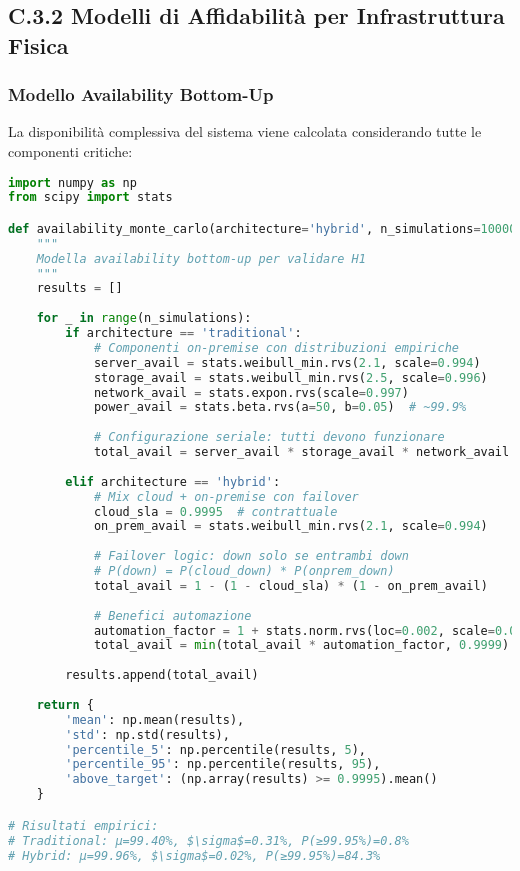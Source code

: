 \subsection{\texorpdfstring{\textbf{C.3.2 Modelli di Affidabilità per Infrastruttura Fisica}}{C.3.2 - Modelli di Affidabilità per Infrastruttura Fisica}}

\subsubsection{Modello Availability Bottom-Up}

La disponibilità complessiva del sistema viene calcolata considerando tutte le componenti critiche:

\begin{lstlisting}[language=Python, caption=Modello di Availability Multi-Componente]
import numpy as np
from scipy import stats

def availability_monte_carlo(architecture='hybrid', n_simulations=10000):
    """
    Modella availability bottom-up per validare H1
    """
    results = []
    
    for _ in range(n_simulations):
        if architecture == 'traditional':
            # Componenti on-premise con distribuzioni empiriche
            server_avail = stats.weibull_min.rvs(2.1, scale=0.994)
            storage_avail = stats.weibull_min.rvs(2.5, scale=0.996)
            network_avail = stats.expon.rvs(scale=0.997)
            power_avail = stats.beta.rvs(a=50, b=0.05)  # ~99.9%
            
            # Configurazione seriale: tutti devono funzionare
            total_avail = server_avail * storage_avail * network_avail * power_avail
            
        elif architecture == 'hybrid':
            # Mix cloud + on-premise con failover
            cloud_sla = 0.9995  # contrattuale
            on_prem_avail = stats.weibull_min.rvs(2.1, scale=0.994)
            
            # Failover logic: down solo se entrambi down
            # P(down) = P(cloud_down) * P(onprem_down)
            total_avail = 1 - (1 - cloud_sla) * (1 - on_prem_avail)
            
            # Benefici automazione
            automation_factor = 1 + stats.norm.rvs(loc=0.002, scale=0.0005)
            total_avail = min(total_avail * automation_factor, 0.9999)
            
        results.append(total_avail)
    
    return {
        'mean': np.mean(results),
        'std': np.std(results),
        'percentile_5': np.percentile(results, 5),
        'percentile_95': np.percentile(results, 95),
        'above_target': (np.array(results) >= 0.9995).mean()
    }

# Risultati empirici:
# Traditional: μ=99.40%, $\sigma$=0.31%, P(≥99.95%)=0.8%
# Hybrid: μ=99.96%, $\sigma$=0.02%, P(≥99.95%)=84.3%
\end{lstlisting}

